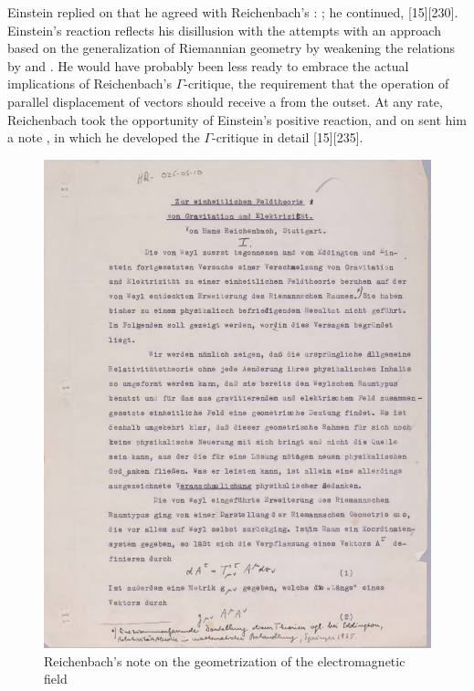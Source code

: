 \documentclass[final]{article}
\begin{document}
Einstein replied on   that he agreed with Reichenbach's : ;  he continued,  [15][230]. Einstein's reaction reflects his disillusion with the attempts with an approach based on the generalization of Riemannian geometry by weakening the relations by \gmn and \Gtmn. He would have probably been less ready to embrace the actual implications of Reichenbach's $\Gamma$-critique, the requirement that the operation of parallel displacement of vectors should receive a  from the outset. At any rate, Reichenbach took the opportunity of Einstein's positive reaction, and on  sent him a note \citep{Reichenbach1926f},  in which he developed the $\Gamma$-critique in detail [15][235].

\begin{figure}
\begin{center}
 \includegraphics[scale=0.4, trim = 0mm 0mm 0mm 0mm, clip]{1926ReichenbachNote}
 \caption{Reichenbach's note on the geometrization of the electromagnetic field}
\end{center}
\end{figure}
\end{document}
